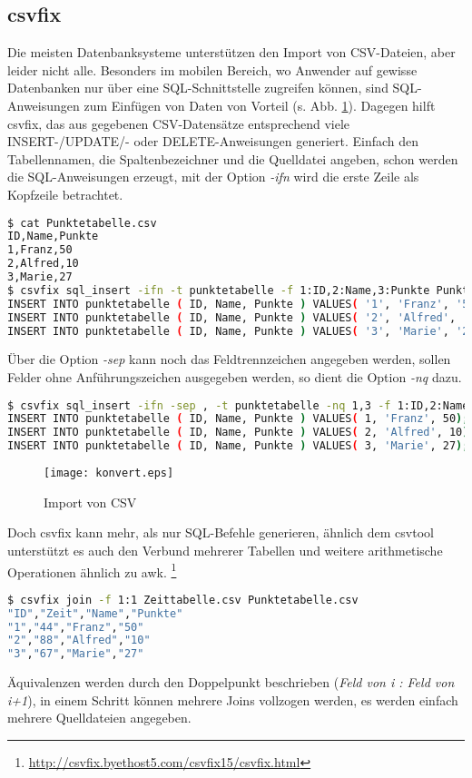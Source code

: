 \subsection{csvfix}
Die meisten Datenbanksysteme unterstützen den Import von CSV-Dateien, aber leider nicht alle. Besonders im mobilen Bereich, wo Anwender auf gewisse Datenbanken nur über eine SQL-Schnittstelle zugreifen können, sind SQL-Anweisungen zum Einfügen von Daten von Vorteil (s. Abb. \ref{fig:konvert}). Dagegen hilft csvfix, das aus gegebenen CSV-Datensätze entsprechend viele INSERT-/UPDATE/- oder DELETE-Anweisungen generiert. Einfach den Tabellennamen, die Spaltenbezeichner und die Quelldatei angeben, schon werden die SQL-Anweisungen erzeugt, mit der Option \textit{-ifn} wird die erste Zeile als Kopfzeile betrachtet.
\begin{lstlisting}[language=Bash]
$ cat Punktetabelle.csv
ID,Name,Punkte
1,Franz,50
2,Alfred,10
3,Marie,27
$ csvfix sql_insert -ifn -t punktetabelle -f 1:ID,2:Name,3:Punkte Punktetabelle.csv
INSERT INTO punktetabelle ( ID, Name, Punkte ) VALUES( '1', 'Franz', '50');
INSERT INTO punktetabelle ( ID, Name, Punkte ) VALUES( '2', 'Alfred', '10');
INSERT INTO punktetabelle ( ID, Name, Punkte ) VALUES( '3', 'Marie', '27');
\end{lstlisting}

Über die Option \textit{-sep} kann noch das Feldtrennzeichen angegeben werden, sollen Felder ohne Anführungszeichen ausgegeben werden, so dient die Option \textit{-nq} dazu.
\begin{lstlisting}[language=Bash]
$ csvfix sql_insert -ifn -sep , -t punktetabelle -nq 1,3 -f 1:ID,2:Name,3:Punkte Punktetabelle.csv
INSERT INTO punktetabelle ( ID, Name, Punkte ) VALUES( 1, 'Franz', 50);
INSERT INTO punktetabelle ( ID, Name, Punkte ) VALUES( 2, 'Alfred', 10);
INSERT INTO punktetabelle ( ID, Name, Punkte ) VALUES( 3, 'Marie', 27);
\end{lstlisting}

\begin{figure}
\centering
\texttt{[image: konvert.eps]}
\caption{Import von CSV}
\label{fig:konvert}
\end{figure}

Doch csvfix kann mehr, als nur SQL-Befehle generieren, ähnlich dem csvtool unterstützt es auch den Verbund mehrerer Tabellen und weitere arithmetische Operationen ähnlich zu awk.
\footnote{\url{http://csvfix.byethost5.com/csvfix15/csvfix.html}}
\begin{lstlisting}[language=Bash]
$ csvfix join -f 1:1 Zeittabelle.csv Punktetabelle.csv 
"ID","Zeit","Name","Punkte"
"1","44","Franz","50"
"2","88","Alfred","10"
"3","67","Marie","27"
\end{lstlisting}
Äquivalenzen werden durch den Doppelpunkt beschrieben (\textit{Feld von i : Feld von i+1}), in einem Schritt können mehrere Joins vollzogen werden, es werden einfach mehrere Quelldateien angegeben.

